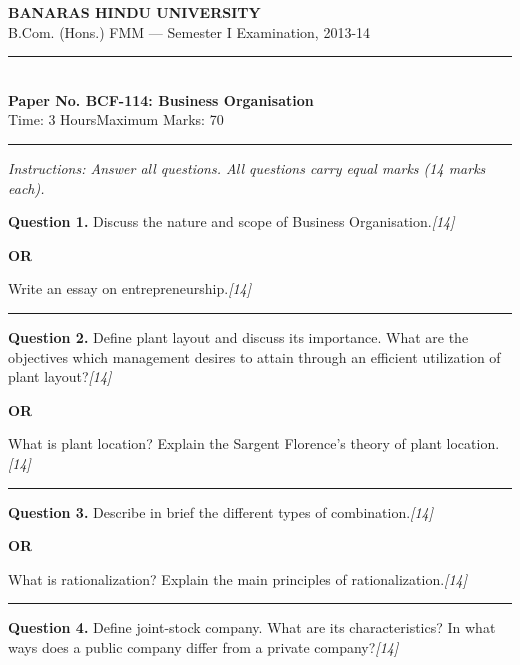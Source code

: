 \documentclass[11pt,a4paper]{article}
\newcommand{\pts}[1]{\hfill   \textit{[#1]}}
\begin{document}
\begin{center}
  {\large\bfseries BANARAS HINDU UNIVERSITY}\\[2pt]
  {\normalsize B.Com. (Hons.) FMM --- Semester I Examination, 2013-14}\\[6pt]
  \rule{0.8\linewidth}{0.5pt}\\[6pt]
  {\large\bfseries Paper No. BCF-114: Business Organisation}\\[4pt]
  {\normalsize Time: 3 Hours\hfill Maximum Marks: 70}
\end{center}

\rule{\linewidth}{0.4pt}

\smallskip



\noindent   \textit{Instructions: Answer all questions. All questions carry equal marks (14 marks each).}

\bigskip




\noindent   \textbf{Question 1.}
Discuss the nature and scope of Business Organisation.\pts{14}

\centerline{   \textbf{OR}}

Write an essay on entrepreneurship.\pts{14}

\medskip\rule{\linewidth}{0.2pt}




\noindent   \textbf{Question 2.}
Define plant layout and discuss its importance. What are the objectives which management desires to attain through an efficient utilization of plant layout?\pts{14}

\centerline{   \textbf{OR}}

What is plant location? Explain the Sargent Florence's theory of plant location.\pts{14}

\medskip\rule{\linewidth}{0.2pt}




\noindent   \textbf{Question 3.}
Describe in brief the different types of combination.\pts{14}

\centerline{   \textbf{OR}}

What is rationalization? Explain the main principles of rationalization.\pts{14}

\medskip\rule{\linewidth}{0.2pt}




\noindent   \textbf{Question 4.}
Define joint-stock company. What are its characteristics? In what ways does a public company differ from a private company?\pts{14}
\end{document}
